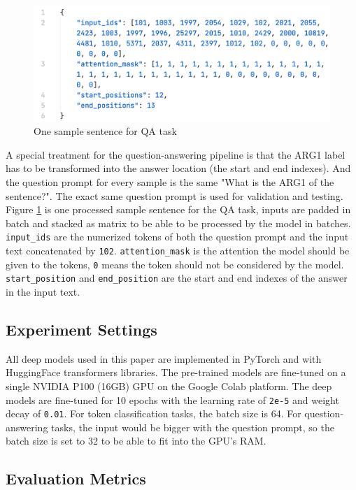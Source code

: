 \documentclass[11pt]{article}
\begin{document}
\begin{figure}[h]
  \centering
  \includegraphics[width=\linewidth]{assets/dataset-one-qa-sample.png}
  \caption{One sample sentence for QA task}
  \label{fig:dataset-one-qa-sample}
\end{figure}

A special treatment for the question-answering pipeline is that the ARG1 label has to be transformed into the answer location (the start and end indexes). And the question prompt for every sample is the same "What is the ARG1 of the sentence?". The exact same question prompt is used for validation and testing. Figure \ref{fig:dataset-one-qa-sample} is one processed sample sentence for the QA task, inputs are padded in batch and stacked as matrix to be able to be processed by the model in batches. \verb|input_ids| are the numerized tokens of both the question prompt and the input text concatenated by \verb|102|. \verb|attention_mask| is the attention the model should be given to the tokens, \verb|0| means the token should not be considered by the model. \verb|start_position| and \verb|end_position| are the start and end indexes of the answer in the input text.


\subsection{Experiment Settings}

All deep models used in this paper are implemented in PyTorch and with HuggingFace transformers libraries. The pre-trained models are fine-tuned on a single NVIDIA P100 (16GB) GPU on the Google Colab platform. The deep models are fine-tuned for 10 epochs with the learning rate of \verb|2e-5| and weight decay of \verb|0.01|. For token classification tasks, the batch size is 64. For question-answering tasks, the input would be bigger with the question prompt, so the batch size is set to 32 to be able to fit into the GPU's RAM.

\subsection{Evaluation Metrics}
\end{document}
